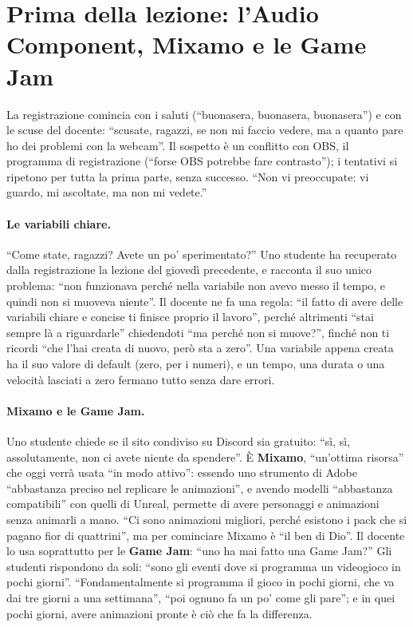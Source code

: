 \section{Prima della lezione: l'Audio Component, Mixamo e le Game Jam}
\label{ue8:sec:inizio}

La registrazione comincia con i saluti (``buonasera, buonasera, buonasera'') e con le
scuse del docente: ``scusate, ragazzi, se non mi faccio vedere, ma a quanto pare ho dei
problemi con la webcam''. Il sospetto è un conflitto con OBS, il programma di
registrazione (``forse OBS potrebbe fare contrasto''); i tentativi si ripetono per tutta
la prima parte, senza successo. ``Non vi preoccupate: vi guardo, mi ascoltate, ma non mi
vedete.''

\paragraph{Le variabili chiare.} ``Come state, ragazzi? Avete un po' sperimentato?''
Uno studente ha recuperato dalla registrazione la lezione del giovedì precedente, e
racconta il suo unico problema: ``non funzionava perché nella variabile non avevo messo
il tempo, e quindi non si muoveva niente''. Il docente ne fa una regola: ``il fatto di
avere delle variabili chiare e concise ti finisce proprio il lavoro'', perché altrimenti
``stai sempre là a riguardarle'' chiedendoti ``ma perché non si muove?'', finché non ti
ricordi ``che l'hai creata di nuovo, però sta a zero''. Una variabile appena creata ha
il suo valore di default (zero, per i numeri), e un tempo, una durata o una velocità
lasciati a zero fermano tutto senza dare errori.

\paragraph{Mixamo e le Game Jam.} Uno studente chiede se il sito condiviso su Discord sia
gratuito: ``sì, sì, assolutamente, non ci avete niente da spendere''. È
\textbf{Mixamo}, ``un'ottima risorsa'' che oggi verrà usata ``in modo attivo'': essendo
uno strumento di Adobe ``abbastanza preciso nel replicare le animazioni'', e avendo
modelli ``abbastanza compatibili'' con quelli di Unreal, permette di avere personaggi e
animazioni senza animarli a mano. ``Ci sono animazioni migliori, perché esistono i pack
che si pagano fior di quattrini'', ma per cominciare Mixamo è ``il ben di Dio''. Il
docente lo usa soprattutto per le \textbf{Game Jam}: ``uno ha mai fatto una Game Jam?''
Gli studenti rispondono da soli: ``sono gli eventi dove si programma un videogioco in
pochi giorni''. ``Fondamentalmente si programma il gioco in pochi giorni, che va dai tre
giorni a una settimana'', ``poi ognuno fa un po' come gli pare''; e in quei pochi giorni,
avere animazioni pronte è ciò che fa la differenza.

